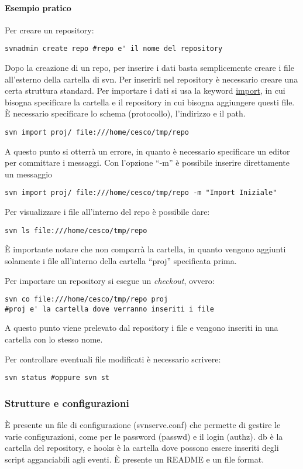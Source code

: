 \paragraph*{Esempio pratico}Per creare un repository:
\begin{verbatim}
svnadmin create repo #repo e' il nome del repository
\end{verbatim}
Dopo la creazione di un repo, per inserire i dati basta semplicemente creare i file all'esterno della cartella di svn. Per inserirli nel repository \`e necessario creare una certa struttura standard. Per importare i dati si usa la keyword \underline{import}, in cui bisogna specificare la cartella e il repository in cui bisogna aggiungere questi file. \`E necessario specificare lo schema (protocollo), l'indirizzo e il path.
\begin{verbatim}
svn import proj/ file:///home/cesco/tmp/repo
\end{verbatim}
A questo punto si otterr\`a un errore, in quanto \`e necessario specificare un editor per committare i messaggi. Con l'opzione ``-m'' \`e possibile inserire direttamente un messaggio
\begin{verbatim}
svn import proj/ file:///home/cesco/tmp/repo -m "Import Iniziale"
\end{verbatim}
Per visualizzare i file all'interno del repo \`e possibile dare:
\begin{verbatim}
svn ls file:///home/cesco/tmp/repo
\end{verbatim}
\`E importante notare che non comparr\`a la cartella, in quanto vengono aggiunti solamente i file all'interno della cartella ``proj'' specificata prima.

Per importare un repository si esegue un \textit{checkout}, ovvero:
\begin{verbatim}
svn co file:///home/cesco/tmp/repo proj
#proj e' la cartella dove verranno inseriti i file
\end{verbatim}
A questo punto viene prelevato dal repository i file e vengono inseriti in una cartella con lo stesso nome.

Per controllare eventuali file modificati \`e necessario scrivere:
\begin{verbatim}
svn status #oppure svn st
\end{verbatim}

\subsubsection{Strutture e configurazioni}

\`E presente un file di configurazione (svnserve.conf) che permette di gestire le varie configurazioni, come per le password (passwd) e il login (authz). db \`e la cartella del repository, e hooks \`e la cartella dove possono essere inseriti degli script agganciabili agli eventi. \`E presente un README e un file format.
